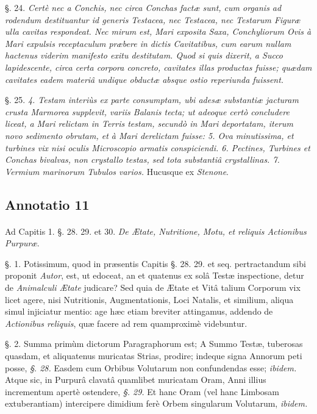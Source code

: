\documentclass[a4paper, 11pt, oneside, polutonikogreek, german]{article}
\begin{document}
§. 24. \emph{Certè nec a Conchis, nec circa Conchas factæ sunt, cum organis ad rodendum destituantur id generis Testacea, nec Testacea, nec Testarum Figuræ ulla cavitas respondeat. Nec mirum est, Mari exposita Saxa, Conchyliorum Ovis à Mari expulsis receptaculum præbere in dictis Cavitatibus, cum earum nullam hactenus viderim manifesto exitu destitutam. Quod si quis dixerit, a Succo lapidescente, circa certa corpora concreto, cavitates illas productas fuisse; quædam cavitates eadem materiâ undique obductæ absque ostio reperiunda fuissent.}

§. 25. \emph{4. Testam interiùs ex parte consumptam, ubi adesæ substantiæ jacturam crusta Marmorea supplevit, variis Balanis tecta; ut adeoque certò concludere liceat, a Mari relictam in Terris testam, secundò in Mari deportatam, iterum novo sedimento obrutam, et à Mari derelictam fuisse: 5. Ova minutissima, et turbines vix nisi oculis Microscopio armatis conspiciendi. 6. Pectines, Turbines et Conchas bivalvas, non crystallo testas, sed tota substantiâ crystallinas. 7. Vermium marinorum Tubulos varios.} Hucusque ex \emph{Stenone}.

\subsection{Annotatio 11}
\paragraph{}
Ad Capitis 1. §. 28. 29. et 30. \emph{De Ætate, Nutritione, Motu, et reliquis Actionibus Purpuræ}.

§. 1. Potissimum, quod in præsentis Capitis §. 28. 29. et seq. pertractandum sibi proponit \emph{Autor}, est, ut edoceat, an et quatenus ex solâ Testæ inspectione, detur de \emph{Animalculi Ætate} judicare? Sed quia de Ætate et Vitâ talium Corporum vix licet agere, nisi Nutritionis, Augmentationis, Loci Natalis, et similium, aliqua simul injiciatur mentio: age hæc etiam breviter attingamus, addendo de \emph{Actionibus reliquis}, quæ facere ad rem quamproximè videbuntur.

§. 2. Summa primùm dictorum Paragraphorum est; A Summo Testæ, tuberosas quasdam, et aliquatenus muricatas Strias, prodire; indeque signa Annorum peti posse, \emph{§. 28.} Easdem cum Orbibus Volutarum non confundendas esse; \emph{ibidem.} Atque sic, in Purpurâ clavatâ quamlibet muricatam Oram, Anni illius incrementum apertè ostendere, \emph{§. 29.} Et hanc Oram (vel hanc Limbosam extuberantiam) intercipere dimidium ferè Orbem singularum Volutarum, \emph{ibidem.}
\end{document}
